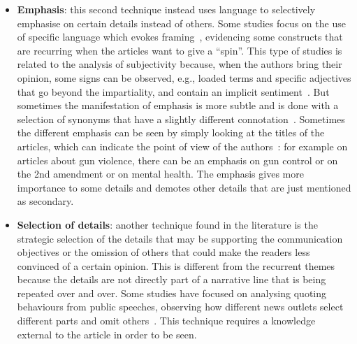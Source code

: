\begin{itemize}
    \item \textbf{Emphasis}: this second technique instead uses language to selectively emphasise on certain details instead of others.
    Some studies focus on the use of specific language which evokes framing~\cite{baumer2015testing}, evidencing some constructs that are recurring when the articles want to give a ``spin''.
    This type of studies is related to the analysis of subjectivity because, when the authors bring their opinion, some signs can be observed, e.g., loaded terms and specific adjectives that go beyond the impartiality, and contain an implicit sentiment~\cite{greene2009more}.
    But sometimes the manifestation of emphasis is more subtle and is done with a selection of synonyms that have a slightly different connotation~\cite{schuldt2011global,rugg1941experiments,tversky1981framing}.
    Sometimes the different emphasis can be seen by simply looking at the titles of the articles, which can indicate the point of
    view of the authors~\cite{liu2019detecting}: for example on articles about gun violence, there can be an emphasis on gun control or on the 2nd amendment or on mental health.
    The emphasis gives more importance to some details and demotes other details that are just mentioned as secondary.
    
    
    \item \textbf{Selection of details}: another technique found in the literature is the strategic selection of the details that may be supporting the communication objectives or the omission of others that could make the readers less convinced of a certain opinion. This is different from the recurrent themes because the details are not directly part of a narrative line that is being repeated over and over.
    Some studies have focused on analysing quoting behaviours from public speeches, observing how different news outlets select different parts and omit others~\cite{niculae2015quotus}.
    This technique requires a knowledge external to the article in order to be seen.


\end{itemize}
